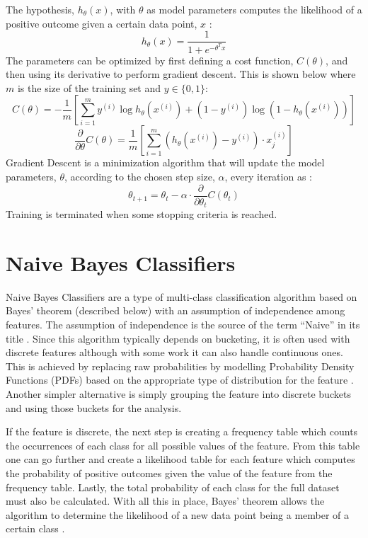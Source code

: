 The hypothesis, $h_\theta(x)$, with $\theta$ as model parameters computes the likelihood of a positive outcome given a certain data point, $x$ \cite{LogisticRegressionOG}:
$$h_\theta(x) = \frac{1}{1 + e^{-\theta^T x}}$$
The parameters can be optimized by first defining a cost function, $C(\theta)$, and then using its derivative to perform gradient descent. This is shown below where $m$ is the size of the training set and $y \in \{0, 1\}$\cite{LogisticRegressionMath}:
$$C(\theta) = -\frac{1}{m}\left[\sum\limits_{i=1}^m y^{(i)} \log h_\theta(x^{(i)}) + (1-y^{(i)})\log(1-h_\theta(x^{(i)}))\right]$$
$$\frac{\partial}{\partial\theta}C(\theta) = \frac{1}{m}\left[\sum\limits_{i=1}^m (h_\theta(x^{(i)}) - y^{(i)})\cdot x_j^{(i)}\right]$$
Gradient Descent is a minimization algorithm that will update the model parameters, $\theta$, according to the chosen step size, $\alpha$, every iteration as \cite{LogisticRegressionMath}:
$$\theta_{t+1} = \theta_t-\alpha\cdot\frac{\partial}{\partial\theta_t}C(\theta_t)$$
Training is terminated when some stopping criteria is reached.

\section{Naive Bayes Classifiers}
Naive Bayes Classifiers are a type of multi-class classification algorithm based on Bayes' theorem (described below) with an assumption of independence among features. The assumption of independence is the source of the term ``Naive'' in its title \cite{NaiveBayesOG}. Since this algorithm typically depends on bucketing, it is often used with discrete features although with some work it can also handle continuous ones. This is achieved by replacing raw probabilities by modelling Probability Density Functions (PDFs) based on the appropriate type of distribution for the feature \cite{NaiveBayesOG}. Another simpler alternative is simply grouping the feature into discrete buckets and using those buckets for the analysis.

If the feature is discrete, the next step is creating a frequency table which counts the occurrences of each class for all possible values of the feature. From this table one can go further and create a likelihood table for each feature which computes the probability of positive outcomes given the value of the feature from the frequency table. Lastly, the total probability of each class for the full dataset must also be calculated. With all this in place, Bayes' theorem allows the algorithm to determine the likelihood of a new data point being a member of a certain class \cite{NaiveBayesOG}.

